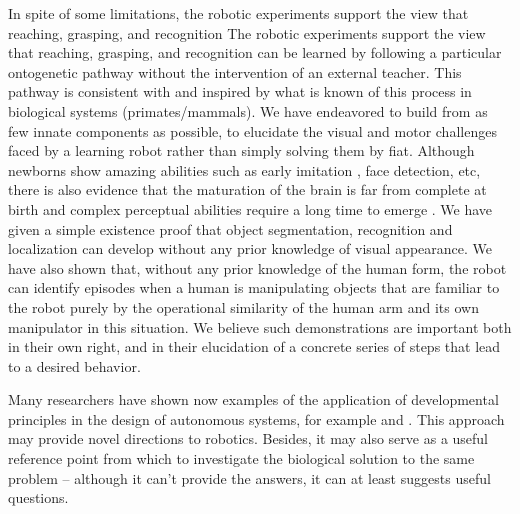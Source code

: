 \ifrev
In spite of some limitations, the robotic experiments support the view that reaching, grasping, and recognition
\else
The robotic experiments support the view that reaching, grasping, and recognition
\fi
can be learned by following a particular ontogenetic pathway without the
intervention of an external teacher.
This pathway is consistent with and inspired by what is
known of this process in biological systems (primates/mammals).
%
We have endeavored to build from as few innate components as possible, to
elucidate the visual and motor challenges faced by a learning robot rather
than simply solving them by fiat.
%
Although newborns show amazing abilities \cite{spelke-2000} such as early imitation 
\cite{meltzoff-moore-1977}, face detection, etc, there is also evidence 
that the maturation of the brain is far from complete at birth and
complex perceptual abilities require a long time to emerge \cite{kovacs00human}.
%
We have given a simple existence proof that object segmentation,
recognition and localization can develop without any prior knowledge
of visual appearance.  We have also shown that, without any prior
knowledge of the human form, the robot can identify episodes when a
human is manipulating objects that are familiar to the robot purely by
the operational similarity of the human arm and its own manipulator in
this situation.  We believe such demonstrations are important both in
their own right, and in their elucidation of a concrete series of
steps that lead to a desired behavior.  

Many researchers have shown now examples of the application of developmental
principles in the design of autonomous systems, for example \cite{weng-2000, weng-2002} 
and \cite{metta99developmental}. This approach may provide novel
directions to robotics. Besides, it may also serve as a useful
reference point from which to investigate the biological solution to
the same problem -- although it can't provide the answers, it can at
least suggests useful questions.

%



